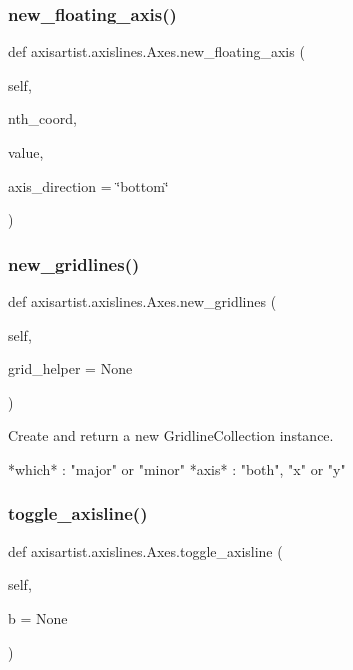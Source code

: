 \subsubsection{\texorpdfstring{new\+\_\+floating\+\_\+axis()}{new\_floating\_axis()}}
{\footnotesize\ttfamily def axisartist.\+axislines.\+Axes.\+new\+\_\+floating\+\_\+axis (\begin{DoxyParamCaption}\item[{}]{self,  }\item[{}]{nth\+\_\+coord,  }\item[{}]{value,  }\item[{}]{axis\+\_\+direction = {\ttfamily \char`\"{}bottom\char`\"{}} }\end{DoxyParamCaption})}

\mbox{\label{classaxisartist_1_1axislines_1_1Axes_ad8f19846c3e6e081b93baa6951d597f7}} 
\subsubsection{\texorpdfstring{new\+\_\+gridlines()}{new\_gridlines()}}
{\footnotesize\ttfamily def axisartist.\+axislines.\+Axes.\+new\+\_\+gridlines (\begin{DoxyParamCaption}\item[{}]{self,  }\item[{}]{grid\+\_\+helper = {\ttfamily None} }\end{DoxyParamCaption})}

\begin{DoxyVerb}Create and return a new GridlineCollection instance.

*which* : "major" or "minor"
*axis* : "both", "x" or "y"\end{DoxyVerb}
 \mbox{\label{classaxisartist_1_1axislines_1_1Axes_a1ac91fb93eb257ecf56a537fa43f0673}} 
\subsubsection{\texorpdfstring{toggle\+\_\+axisline()}{toggle\_axisline()}}
{\footnotesize\ttfamily def axisartist.\+axislines.\+Axes.\+toggle\+\_\+axisline (\begin{DoxyParamCaption}\item[{}]{self,  }\item[{}]{b = {\ttfamily None} }\end{DoxyParamCaption})}



